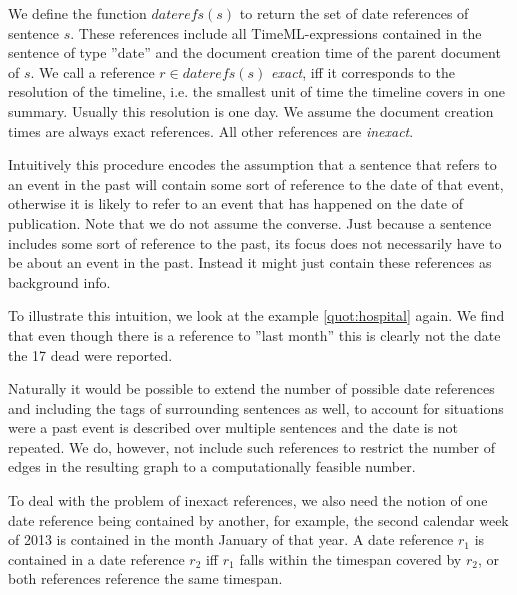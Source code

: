 \documentclass[a4paper,BCOR=10mm]{report}
\numberwithin{lemma}{chapter}
\numberwithin{definition}{chapter}
\begin{document}
We define the function $\mathit{daterefs}(s)$ to return the set of date references of sentence $s$. These references include all TimeML-expressions \citep{timeml} contained in the sentence of type ''date'' and the document creation time of the parent document of $s$.
We call a reference $r \in \mathit{daterefs}(s)$ \textit{exact}, iff it corresponds to the resolution of the timeline, i.e. the smallest unit of time the timeline covers in one summary. Usually this resolution is one day. We assume the document creation times are always exact references. All other references are \textit{inexact}.

Intuitively this procedure encodes the assumption that a sentence that refers to an event in the past will contain some sort of reference to the date of that event, otherwise it is likely to refer to an event that has happened on the date of publication.
Note that we do not assume the converse. Just because a sentence includes some sort of reference to the past, its focus does not necessarily have to be about an event in the past. Instead it might just contain these references as background info.

To illustrate this intuition, we look at the example \ref{quot:hospital} again. We find that even though there is a reference to ''last month'' this is clearly not the date the 17 dead were reported.

Naturally it would be possible to extend the number of possible date references and including the tags of surrounding sentences as well, to account for situations were a past event is described over multiple sentences and the date is not repeated. We do, however, not include such references to restrict the number of edges in the resulting graph to a computationally feasible number.

To deal with the problem of inexact references, we also need the notion of one date reference being contained by another, for example, the second calendar week of 2013 is contained in the month January of that year.
A date reference $r_1$ is contained in a date reference $r_2$ iff $r_1$ falls within the timespan covered by $r_2$, or both references reference the same timespan.
\end{document}
